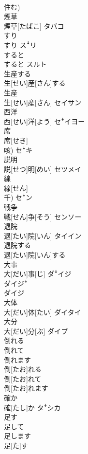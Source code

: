 \documentclass[8pt]{extreport}
\begin{document}
\begin{CJK}{UTF8}{min}
\\	住む)	
\\	煙草	
\\	煙草[たばこ]	タバコ
\\	すり	
\\	すり	スꜜリ
\\	すると	
\\	すると	スルト
\\	生産する	
\\	生[せい]産[さん]する	
\\	生産	
\\	生[せい]産[さん]	セイサン
\\	西洋	
\\	西[せい]洋[よう]	セꜜイヨー
\\	席	
\\	席[せき] 
\\	咳)	セꜜキ
\\	説明	
\\	説[せつ]明[めい]	セツメイ
\\	線	
\\	線[せん] 
\\	千)	セꜜン
\\	戦争	
\\	戦[せん]争[そう]	センソー
\\	退院	
\\	退[たい]院[いん]	タイイン
\\	退院する	
\\	退[たい]院[いん]する	
\\	大事	
\\	大[だい]事[じ]	ダꜜイジ 
\\	ダイジꜜ 
\\	ダイジ
\\	大体	
\\	大[だい]体[たい]	ダイタイ
\\	大分	
\\	大[だい]分[ぶ]	ダイブ
\\	倒れる 
\\	倒れて 
\\	倒れます	
\\	倒[たお]れる 
\\	倒[たお]れて 
\\	倒[たお]れます	
\\	確か	
\\	確[たし]か	タꜜシカ
\\	足す 
\\	足して 
\\	足します	
\\	足[た]す 

\end{CJK}
\end{document}
